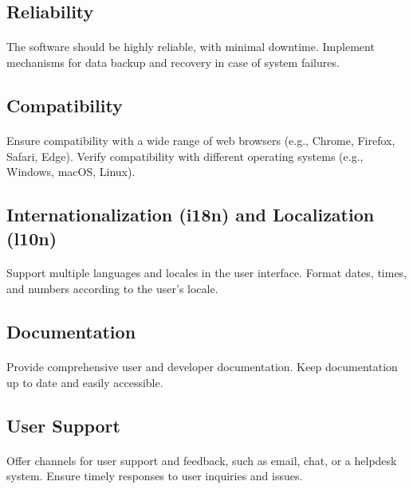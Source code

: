 \documentclass{article}
\begin{document}
\subsection{Reliability}
\paragraph{}
The software should be highly reliable, with minimal downtime.
Implement mechanisms for data backup and recovery in case of system failures.

\subsection{Compatibility}
\paragraph{}
Ensure compatibility with a wide range of web browsers (e.g., Chrome, Firefox, Safari, Edge).
Verify compatibility with different operating systems (e.g., Windows, macOS, Linux).

\subsection{Internationalization (i18n) and Localization (l10n)}
\paragraph{}
Support multiple languages and locales in the user interface.
Format dates, times, and numbers according to the user's locale.

\subsection{Documentation}
\paragraph{}
Provide comprehensive user and developer documentation.
Keep documentation up to date and easily accessible.

\subsection{User Support}
\paragraph{}
Offer channels for user support and feedback, such as email, chat, or a helpdesk system.
Ensure timely responses to user inquiries and issues.
\end{document}
